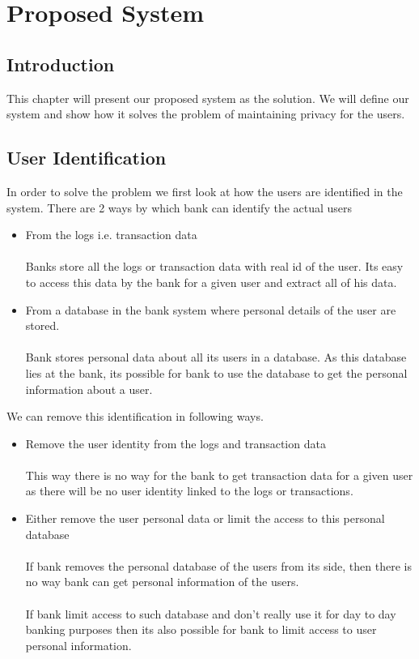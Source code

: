 \chapter{Proposed System}
\section{Introduction}
This chapter will present our proposed system as the solution. We will define our system and show how it solves the problem of maintaining privacy for the users.
\section{User Identification}
In order to solve the problem we first look at how the users are identified in the system. There are 2 ways by which bank can identify the actual users
\begin{itemize}
	\item From the logs i.e. transaction data
\\
\\Banks store all the logs or transaction data with real id of the user. Its easy to access this data by the bank for a given user and extract all of his data.
	\item From a database in the bank system where personal details of the user are stored.	
\\
\\Bank stores personal data about all its users in a database. As this database lies at the bank, its possible for bank to use the database to get the personal information about a user.
\end{itemize}
We can remove this identification in following ways.
\begin{itemize}
	\item Remove the user identity from the logs and transaction data
\\
\\This way there is no way for the bank to get transaction data for a given user as there will be no user identity linked to the logs or transactions.
	\item Either remove the user personal data or limit the access to this personal database
\\
\\If bank removes the personal database of the users from its side, then there is no way bank can get personal information of the users.
\\
\\If bank limit access to such database and don't really use it for day to day banking purposes then its also possible for bank to limit access to user personal information.
\end{itemize}
